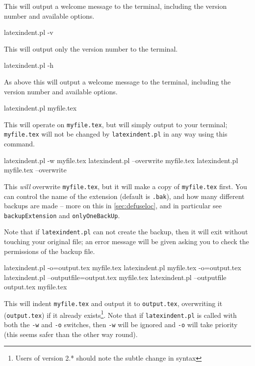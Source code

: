 	This will output a welcome message to the terminal, including the version number
	and available options.

	\begin{commandshell}
latexindent.pl -v
      \end{commandshell}
	This will output only the version number to the terminal.


	\begin{commandshell}
latexindent.pl -h
      \end{commandshell}

	As above this will output a welcome message to the terminal, including the version number
	and available options.
	\begin{commandshell}
latexindent.pl myfile.tex
      \end{commandshell}

	This will operate on \texttt{myfile.tex}, but will simply output to your terminal; \texttt{myfile.tex} will	not be changed
	by \texttt{latexindent.pl} in any way using this command.

	\begin{commandshell}
latexindent.pl -w myfile.tex
latexindent.pl --overwrite myfile.tex
latexindent.pl myfile.tex --overwrite 
      \end{commandshell}

	This \emph{will} overwrite \texttt{myfile.tex}, but it will
	make a copy of \texttt{myfile.tex} first. You can control the name of
	the extension (default is \texttt{.bak}), and how many different backups are made --
	more on this in \cref{sec:defuseloc}, and in particular see \texttt{backupExtension} and \texttt{onlyOneBackUp}.

	Note that if \texttt{latexindent.pl} can not create the backup, then it
	will exit without touching your original file; an error message will be given
	asking you to check the permissions of the backup file.

	\begin{commandshell} 
latexindent.pl -o=output.tex myfile.tex
latexindent.pl myfile.tex -o=output.tex 
latexindent.pl --outputfile=output.tex myfile.tex
latexindent.pl --outputfile output.tex myfile.tex
      \end{commandshell}

	This will indent \texttt{myfile.tex} and output it to \texttt{output.tex},
	overwriting it (\texttt{output.tex}) if it already exists\footnote{Users of version 2.* should
		note the subtle change in syntax}. Note that if \texttt{latexindent.pl} is called with both
	the \texttt{-w} and \texttt{-o} switches, then \texttt{-w} will
	be ignored and \texttt{-o} will take priority (this seems safer than the
	other way round).

